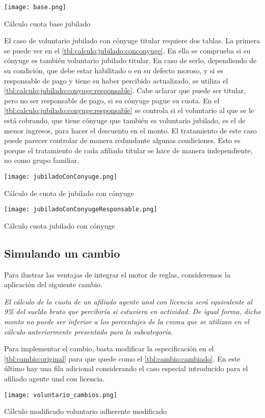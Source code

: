 \begin{table*}
    \centering
    \texttt{[image: base.png]}
    \caption{Cálculo cuota base jubilado}
    \label{tbl:calculo:jubilado:base}
\end{table*}

El caso de voluntario jubilado con cónyuge titular requiere dos tablas. 
La primera se puede ver en el \cref{tbl:calculo:jubilado:conconyuge}.
En ella se comprueba si su cónyuge es también voluntario jubilado titular.
En caso de serlo, dependiendo de su condición, que debe estar habilitado o en su defecto moroso, y si es responsable de pago y tiene su haber percibido actualizado, se utiliza el \cref{tbl:calculo:jubilado:conyuge:responsable}.
Cabe aclarar que puede ser titular, pero no ser responsable de pago, si su cónyuge pague su cuota. 
En el \cref{tbl:calculo:jubilado:conyuge:responsable} se controla si el voluntario al que se le está cobrando, que tiene cónyuge que también es voluntario jubilado, es el de menor ingresos, para hacer el descuento en el monto.
El tratamiento de este caso puede parecer controlar de manera redundante algunas condiciones. 
Esto es porque el tratamiento de cada afiliado titular se hace de manera independiente, no como grupo familiar.

\begin{table*}
    \centering
    \texttt{[image: jubiladoConConyuge.png]}
    \caption{Cálculo de cuota de jubilado con cónyuge}
    \label{tbl:calculo:jubilado:conconyuge}
\end{table*}

\begin{table*}
    \centering
    \texttt{[image: jubiladoConConyugeResponsable.png]}
    \caption{Cálculo cuota jubilado con cónyuge}
    \label{tbl:calculo:jubilado:conyuge:responsable}
\end{table*}

\subsection{Simulando un cambio}
\label{ssec:integracion:cambio}

Para ilustrar las ventajas de integrar el motor de reglas, consideremos la aplicación del siguiente cambio.

\emph{
El cálculo de la cuota de un afiliado agente \acrshort{unsl} con licencia será equivalente al 9\% del sueldo bruto que percibiría si estuviera en actividad. 
De igual forma, dicho monto no puede ser inferior a los porcentajes de la \acrshort{cmmu} que se utilizan en el cálculo anteriormente presentado para la subcategoría.
}

Para implementar el cambio, basta modificar la especificación en el \cref{tbl:cambio:original} para que quede como el \cref{tbl:cambio:cambiado}. 
En este último hay una fila adicional considerando el caso especial introducido para el afiliado agente \acrshort{unsl} con licencia.

\begin{table*}
    \centering
    \texttt{[image: voluntario\_cambios.png]}
    \caption{Cálculo modificado voluntario adherente modificado}
    \label{tbl:cambio:cambiado}
\end{table*}
